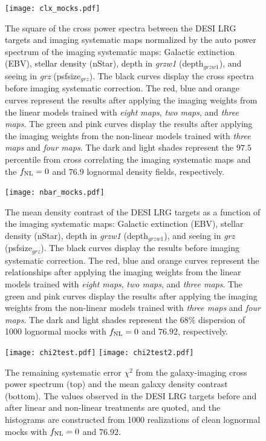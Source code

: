 \begin{figure}
\centering
\texttt{[image: clx\_mocks.pdf]}
\caption{The square of the cross power spectra between the DESI LRG targets and imaging systematic maps normalized by the auto power spectrum of the imaging systematic maps: Galactic extinction (EBV), stellar density (nStar), depth in \textit{grzw1} (depth$_{grzw1}$), and seeing in \textit{grz} (psfsize$_{grz}$). The black curves display the cross spectra before imaging systematic correction. The red, blue and orange curves represent the results after applying the imaging weights from the linear models trained with \textit{eight maps}, \textit{two maps}, and \textit{three maps}. The green and pink curves display the results after applying the imaging weights from the non-linear models trained with \textit{three maps} and \textit{four maps}. The dark and light shades represent the $97.5$ percentile from cross correlating the imaging systematic maps and the $f_{\rm NL}=0$ and $76.9$ lognormal density fields, respectively.}\label{fig:clxmock}
\end{figure}

\begin{figure}
\centering
\texttt{[image: nbar\_mocks.pdf]}
\caption{The mean density contrast of the DESI LRG targets as a function of the imaging systematic maps: Galactic extinction (EBV), stellar density (nStar), depth in \textit{grzw1} (depth$_{grzw1}$), and seeing in \textit{grz} (psfsize$_{grz}$). The black curves display the results before imaging systematic correction. The red, blue and orange curves represent the relationships after applying the imaging weights from the linear models trained with \textit{eight maps}, \textit{two maps}, and \textit{three maps}. The green and pink curves display the results after applying the imaging weights from the non-linear models trained with \textit{three maps} and \textit{four maps}. The dark and light shades represent the $68\%$ dispersion of 1000 lognormal mocks with $f_{\rm NL}=0$ and $76.92$, respectively.}\label{fig:nbarmock}
\end{figure}


\begin{figure}
\raggedleft
\texttt{[image: chi2test.pdf]}
\texttt{[image: chi2test2.pdf]}
\caption{The remaining systematic error $\chi^{2}$ from the galaxy-imaging cross power spectrum (top) and the mean galaxy density contrast (bottom). The values observed in the DESI LRG targets before and after linear and non-linear treatments are quoted, and the histograms are constructed from 1000 realizations of clean lognormal mocks with $f_{\rm NL}=0$ and $76.92$. }\label{fig:chi2test}
\end{figure}



